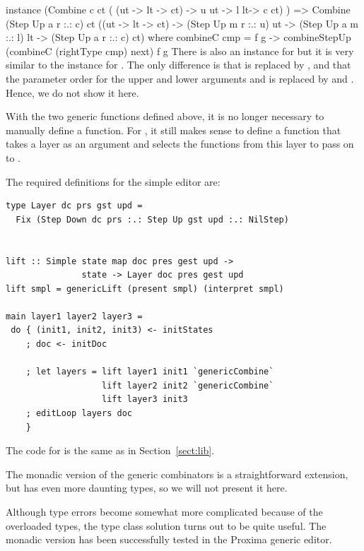 \documentclass[preprint,natbib]{sigplanconf}
\begin{document}
\bc
instance (Combine c ct ( (ut -> lt -> ct) ->
                        u ut -> l lt-> c ct) ) =>
         Combine (Step Up a r :.: c) ct
                 ((ut -> lt -> ct) -> 
                  (Step Up m r :.: u) ut -> 
                  (Step Up a m :.: l) lt -> 
                  (Step Up a r :.: c) ct) where
  combineC cmp = \next f g ->
    combineStepUp (combineC (rightType cmp) next) f g
\ec
There is also an instance for  but it is very similar to the instance for . The only difference is that  is replaced by , and that the parameter order for the upper and lower arguments   and  is replaced by  and . Hence, we do not show it here.





With the two generic functions defined above, it is no longer necessary to manually define a  function. For , it still makes sense to define a function that takes a layer as an argument and selects the functions from this layer to pass on to .

The required definitions for the simple editor are:

\begin{small}
\begin{verbatim}
type Layer dc prs gst upd = 
  Fix (Step Down dc prs :.: Step Up gst upd :.: NilStep)

                
lift :: Simple state map doc pres gest upd ->
               state -> Layer doc pres gest upd
lift smpl = genericLift (present smpl) (interpret smpl)

main layer1 layer2 layer3 =
 do { (init1, init2, init3) <- initStates
    ; doc <- initDoc 

    ; let layers = lift layer1 init1 `genericCombine` 
                   lift layer2 init2 `genericCombine`
                   lift layer3 init3
    ; editLoop layers doc
    }
\end{verbatim}
\end{small}

The code for  is the same as in Section~\ref{sect:lib}.

The monadic version of the generic combinators is a straightforward extension, but has even more daunting types, so we will not present it here. 

Although type errors become somewhat more complicated because of the overloaded types, the type class solution turns out to be quite useful. The monadic version has been successfully tested in the Proxima generic editor.
\end{document}
